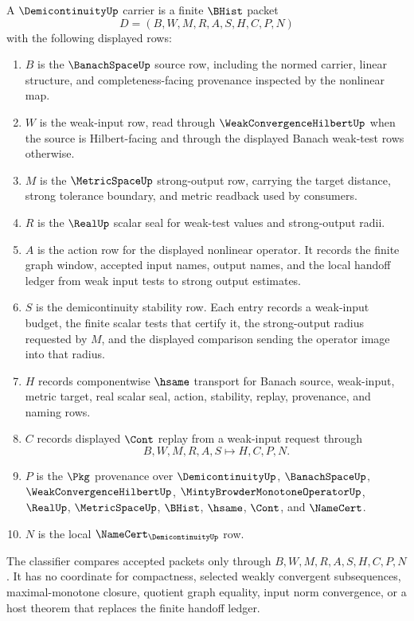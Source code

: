 \begin{definition}
\label{def:demicontinuity-carrier}
A $\DemicontinuityUp$ carrier is a finite $\BHist$ packet
$$
D=(B,W,M,R,A,S,H,C,P,N)
$$
with the following displayed rows:
\begin{enumerate}
\item $B$ is the $\BanachSpaceUp$ source row, including the normed carrier, linear structure, and completeness-facing provenance inspected by the nonlinear map.
\item $W$ is the weak-input row, read through $\WeakConvergenceHilbertUp$ when the source is Hilbert-facing and through the displayed Banach weak-test rows otherwise.
\item $M$ is the $\MetricSpaceUp$ strong-output row, carrying the target distance, strong tolerance boundary, and metric readback used by consumers.
\item $R$ is the $\RealUp$ scalar seal for weak-test values and strong-output radii.
\item $A$ is the action row for the displayed nonlinear operator. It records the finite graph window, accepted input names, output names, and the local handoff ledger from weak input tests to strong output estimates.
\item $S$ is the demicontinuity stability row. Each entry records a weak-input budget, the finite scalar tests that certify it, the strong-output radius requested by $M$, and the displayed comparison sending the operator image into that radius.
\item $H$ records componentwise $\hsame$ transport for Banach source, weak-input, metric target, real scalar seal, action, stability, replay, provenance, and naming rows.
\item $C$ records displayed $\Cont$ replay from a weak-input request through
$$
B,W,M,R,A,S \longmapsto H,C,P,N .
$$
\item $P$ is the $\Pkg$ provenance over $\DemicontinuityUp$, $\BanachSpaceUp$, $\WeakConvergenceHilbertUp$, $\MintyBrowderMonotoneOperatorUp$, $\RealUp$, $\MetricSpaceUp$, $\BHist$, $\hsame$, $\Cont$, and $\NameCert$.
\item $N$ is the local $\NameCert_{\DemicontinuityUp}$ row.
\end{enumerate}
The classifier compares accepted packets only through $B,W,M,R,A,S,H,C,P,N$. It has no coordinate for compactness, selected weakly convergent subsequences, maximal-monotone closure, quotient graph equality, input norm convergence, or a host theorem that replaces the finite handoff ledger.
\end{definition}

